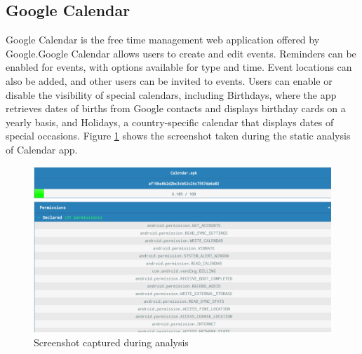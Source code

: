 \subsection{Google Calendar}
Google Calendar is the free time management web application offered by Google.Google Calendar allows users to create and edit events. Reminders can be enabled for events, with options available for type and time. Event locations can also be added, and other users can be invited to events. Users can enable or disable the visibility of special calendars, including Birthdays, where the app retrieves dates of births from Google contacts and displays birthday cards on a yearly basis, and Holidays, a country-specific calendar that displays dates of special occasions. Figure \ref{fig:cal} shows the screenshot taken during the static analysis of Calendar app.
\begin{figure}[!h]
  \centering
  \includegraphics [scale=0.5] {cal.png}
  \caption{Screenshot captured during analysis}
  \label{fig:cal}
\end{figure}
